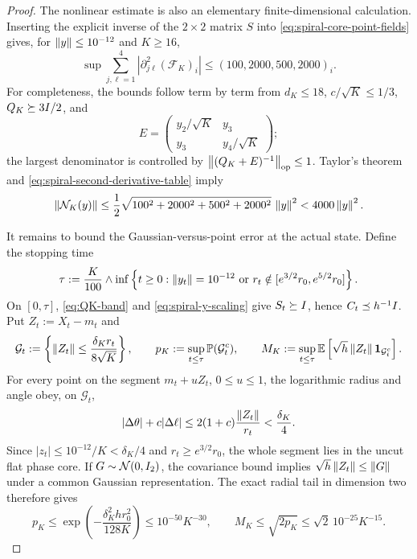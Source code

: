 \begin{proof}
The nonlinear estimate is also an elementary finite-dimensional calculation.  Inserting the
explicit inverse of the $2\times2$ matrix $S$ into \eqref{eq:spiral-core-point-fields} gives, for
$\left\lVert y\right\rVert\leq10^{-12}$ and $K\geq16$,
\begin{equation}
\label{eq:spiral-second-derivative-table}
 \sup\sum_{j,\ell=1}^4
 \left|\partial_{j\ell}^2(\mathcal F_K)_i\right|
 \leq(100,2000,500,2000)_i.
\end{equation}
For completeness, the bounds follow term by term from $d_K\leq18$, $c/\sqrt K\leq1/3$,
$Q_K\succeq3I/2$, and
\[
 E=\begin{pmatrix}y_2/\sqrt K&y_3\\y_3&y_4/\sqrt K\end{pmatrix};
\]
the largest denominator is controlled by
$\left\lVert (Q_K+E)^{-1}\right\rVert_{\mathrm{op}}\leq1$.  Taylor's theorem and
\eqref{eq:spiral-second-derivative-table} imply
\begin{equation}
\label{eq:spiral-nonlinear}
 \left\lVert \mathcal N_K(y)\right\rVert
 \leq\frac12\sqrt{100^2+2000^2+500^2+2000^2}\,\left\lVert y\right\rVert^2
 <4000\left\lVert y\right\rVert^2.
\end{equation}

It remains to bound the Gaussian-versus-point error at the actual state.  Define the stopping time
\begin{equation}
\label{eq:spiral-stopping-time}
 \tau:=\frac K{100}\wedge
 \inf\left\{t\geq0:\left\lVert y_t\right\rVert=10^{-12}
 \ \text{or}\ r_t\notin[e^{3/2}r_0,e^{5/2}r_0]\right\}.
\end{equation}
On $[0,\tau]$, \eqref{eq:QK-band} and \eqref{eq:spiral-y-scaling} give
$S_t\succeq I$, hence $C_t\preceq h^{-1}I$.  Put $Z_t:=X_t-m_t$ and
\[
 \mathcal G_t:=\left\{\left\lVert Z_t\right\rVert\leq\frac{\delta_Kr_t}{8\sqrt K}\right\},
 \qquad
 p_K:=\sup_{t\leq\tau}\mathbb{P}(\mathcal G_t^c),
 \qquad
 M_K:=\sup_{t\leq\tau}
 \mathbb{E}\left[\sqrt h\left\lVert Z_t\right\rVert\mathbf1_{\mathcal G_t^c}\right].
\]
For every point on the segment $m_t+uZ_t$, $0\leq u\leq1$, the logarithmic radius and angle
obey, on $\mathcal G_t$,
\[
 |\Delta\theta|+c|\Delta\ell|
 \leq2(1+c)\frac{\left\lVert Z_t\right\rVert}{r_t}<\frac{\delta_K}{4}.
\]
Since $|z_t|\leq10^{-12}/K<\delta_K/4$ and $r_t\geq e^{3/2}r_0$, the whole segment lies in the
uncut flat phase core.  If $G\sim\mathcal{N}(0,I_2)$, the covariance bound implies
$\sqrt h\left\lVert Z_t\right\rVert\leq\left\lVert G\right\rVert$ under a common Gaussian representation.  The exact radial tail in
dimension two therefore gives
\begin{equation}
\label{eq:spiral-tail-certificate}
 p_K
 \leq\exp\left(-\frac{\delta_K^2hr_0^2}{128K}\right)
 \leq10^{-50}K^{-30},
 \qquad
 M_K\leq\sqrt{2p_K}\leq\sqrt2\,10^{-25}K^{-15}.
\end{equation}


\end{proof}
